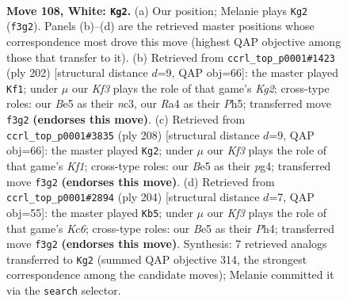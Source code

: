 \documentclass[11pt]{article}
\begin{document}
\clearpage

\begin{figure}[p]\centering
\begin{subfigure}{0.46\textwidth}\centering
\resizebox{\linewidth}{!}{%
\newchessgame
\chessboard[
  setfen={5r2/8/7k/4B3/R7/P4K2/8/8 w - - 8 108},
  showmover=false,
  pgfstyle=straightmove, color=movearrow, markmove={f3-g2}
]}
\caption{}
\end{subfigure}\hfill
\begin{subfigure}{0.46\textwidth}\centering
\resizebox{\linewidth}{!}{%
\newchessgame
\chessboard[
  setfen={8/8/R5P1/7P/5k2/2n5/1r4K1/8 w - - 5 102},
  showmover=false,
  pgfstyle=straightmove, color=movearrow, markmove={g2-f1}
]}
\caption{}
\end{subfigure}
\\[4pt]
\begin{subfigure}{0.46\textwidth}\centering
\resizebox{\linewidth}{!}{%
\newchessgame
\chessboard[
  setfen={8/8/3R1P2/8/5kp1/8/8/r4K2 w - - 8 105},
  showmover=false,
  pgfstyle=straightmove, color=movearrow, markmove={f1-g2}
]}
\caption{}
\end{subfigure}\hfill
\begin{subfigure}{0.46\textwidth}\centering
\resizebox{\linewidth}{!}{%
\newchessgame
\chessboard[
  setfen={1R6/1P4k1/2K5/8/7P/8/2r5/8 w - - 17 103},
  showmover=false,
  pgfstyle=straightmove, color=movearrow, markmove={c6-b5}
]}
\caption{}
\end{subfigure}
\caption{\textbf{Move 108, White: \texttt{Kg2}.} (a) Our position; Melanie plays \texttt{Kg2} (\texttt{f3g2}). Panels (b)--(d) are the retrieved master positions whose correspondence most drove this move (highest QAP objective among those that transfer to it). (b) Retrieved from \texttt{ccrl\_top\_p0001\#1423} (ply 202) [structural distance $d$=9, QAP obj=66]: the master played \texttt{Kf1}; under $\mu$ our \emph{Kf3} plays the role of that game's \emph{Kg2}; cross-type roles: our \emph{B}e5 as their \emph{n}c3, our \emph{R}a4 as their \emph{P}h5; transferred move \texttt{f3g2} \textbf{(endorses this move)}. (c) Retrieved from \texttt{ccrl\_top\_p0001\#3835} (ply 208) [structural distance $d$=9, QAP obj=66]: the master played \texttt{Kg2}; under $\mu$ our \emph{Kf3} plays the role of that game's \emph{Kf1}; cross-type roles: our \emph{B}e5 as their \emph{p}g4; transferred move \texttt{f3g2} \textbf{(endorses this move)}. (d) Retrieved from \texttt{ccrl\_top\_p0001\#2894} (ply 204) [structural distance $d$=7, QAP obj=55]: the master played \texttt{Kb5}; under $\mu$ our \emph{Kf3} plays the role of that game's \emph{Kc6}; cross-type roles: our \emph{B}e5 as their \emph{P}h4; transferred move \texttt{f3g2} \textbf{(endorses this move)}. Synthesis: 7 retrieved analogs transferred to \texttt{Kg2} (summed QAP objective 314, the strongest correspondence among the candidate moves); Melanie committed it via the \texttt{search} selector.}
\label{fig:thought-m214}
\end{figure}
\end{document}
